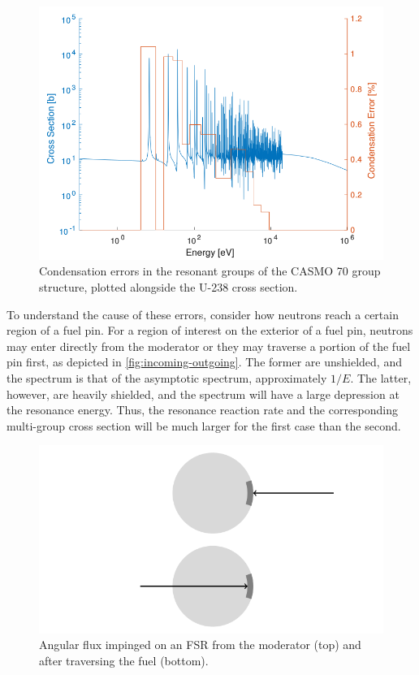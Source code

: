 \begin{figure}
  \centering
  \includegraphics[width=\linewidth]{figures/case1-error}
  \caption{Condensation errors in the resonant groups of the CASMO 70 group structure, plotted alongside the U-238 cross section.}
  \label{fig:case1-error}
\end{figure}

To understand the cause of these errors, consider how neutrons reach a certain region of a fuel pin.  For a region of interest on the exterior of a fuel pin, neutrons may enter directly from the moderator or they may traverse a portion of the fuel pin first, as depicted in \autoref{fig:incoming-outgoing}.  The former are unshielded, and the spectrum is that of the asymptotic spectrum, approximately $1/E$.  The latter, however, are heavily shielded, and the spectrum will have a large depression at the resonance energy.  Thus, the resonance reaction rate and the corresponding multi-group cross section will be much larger for the first case than the second.

\begin{figure}
  \centering
  \includegraphics[width=1.15\linewidth]{figures/incoming-outgoing}
  \caption{Angular flux impinged on an FSR from the moderator (top) and after traversing the fuel (bottom).}
\label{fig:incoming-outgoing}
\end{figure}


